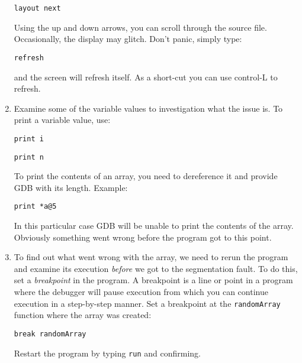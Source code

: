 \documentclass[12pt]{scrartcl}
\begin{document}
\begin{enumerate}
  \texttt{layout next}
  
  Using the up and down arrows, you can scroll through the source file.
  Occasionally, the display may glitch.  Don't panic, simply type:
  
  \texttt{refresh}
  
  and the screen will refresh itself.  As a short-cut you can use control-L
  to refresh.
  
  \item Examine some of the variable values to investigation what the
  issue is.  To print a variable value, use:
  
  \texttt{print i}

  \texttt{print n}
  
  To print the contents of an array, you need to dereference it and 
  provide GDB with its length.  Example:
  
  \texttt{print *a@5}
  
  In this particular case GDB will be unable to print the contents of the
  array.  Obviously something went wrong before the program got to this point.
  
  \item To find out what went wrong with the array, we need to rerun
  the program and examine its execution \emph{before} we got to the
  segmentation fault.  To do this, set a \emph{breakpoint} in the program.
  A breakpoint is a line or point in a program where the debugger will 
  pause execution from which you can continue execution in a step-by-step
  manner.  Set a breakpoint at the \texttt{randomArray} function 
  where the array was created:
  
  \texttt{break randomArray}
  
  Restart the program by typing \texttt{run} and confirming.
  

\end{enumerate}
\end{document}
